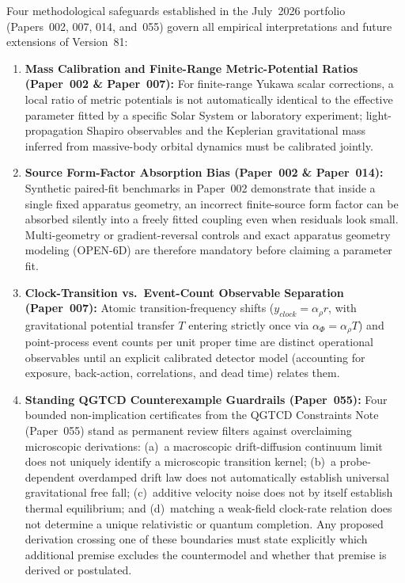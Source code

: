 \documentclass[american,11pt,letterpaper]{article}
\def\mathcal#1{#1}%
\def\mathrm#1{#1}%
\def\texttt#1{#1}%
\def\emph#1{#1}%
\begin{document}
Four methodological safeguards established in the July~2026 portfolio (Papers~002, 007, 014, and~055) govern all empirical interpretations and future extensions of Version~81:
\begin{enumerate}[leftmargin=2em]
  \item \textbf{Mass Calibration and Finite-Range Metric-Potential Ratios (Paper~002 \& Paper~007):} For finite-range Yukawa scalar corrections, a local ratio of metric potentials is \emph{not} automatically identical to the effective parameter fitted by a specific Solar System or laboratory experiment; light-propagation Shapiro observables and the Keplerian gravitational mass inferred from massive-body orbital dynamics must be calibrated jointly.
  \item \textbf{Source Form-Factor Absorption Bias (Paper~002 \& Paper~014):} Synthetic paired-fit benchmarks in Paper~002 demonstrate that inside a single fixed apparatus geometry, an incorrect finite-source form factor can be absorbed silently into a freely fitted coupling even when residuals look small. Multi-geometry or gradient-reversal controls and exact apparatus geometry modeling (\texttt{OPEN-6D}) are therefore mandatory before claiming a parameter fit.
  \item \textbf{Clock-Transition vs.\ Event-Count Observable Separation (Paper~007):} Atomic transition-frequency shifts ($y_{\mathrm{clock}} = \alpha_\rho r$, with gravitational potential transfer $\mathcal{T}$ entering strictly once via $\alpha_\Phi = \alpha_\rho\mathcal{T}$) and point-process event counts per unit proper time are distinct operational observables until an explicit calibrated detector model (accounting for exposure, back-action, correlations, and dead time) relates them.
  \item \textbf{Standing QGTCD Counterexample Guardrails (Paper~055):} Four bounded non-implication certificates from the \emph{QGTCD Constraints Note} (Paper~055) stand as permanent review filters against overclaiming microscopic derivations: (a)~a macroscopic drift-diffusion continuum limit does not uniquely identify a microscopic transition kernel; (b)~a probe-dependent overdamped drift law does not automatically establish universal gravitational free fall; (c)~additive velocity noise does not by itself establish thermal equilibrium; and (d)~matching a weak-field clock-rate relation does not determine a unique relativistic or quantum completion. Any proposed derivation crossing one of these boundaries must state explicitly which additional premise excludes the countermodel and whether that premise is derived or postulated.
\end{enumerate}
\end{document}
